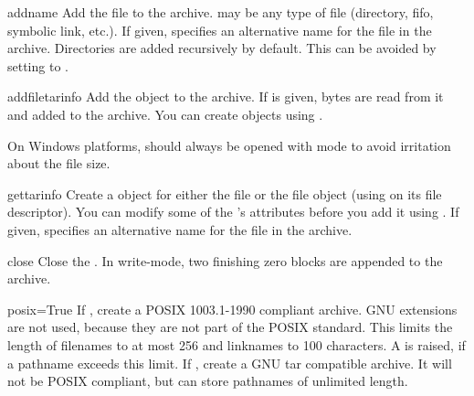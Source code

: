 \begin{methoddesc}{add}{name}
    Add the file  to the archive.  may be any type
    of file (directory, fifo, symbolic link, etc.).
    If given,  specifies an alternative name for the file in the
    archive. Directories are added recursively by default.
    This can be avoided by setting  to .
\end{methoddesc}

\begin{methoddesc}{addfile}{tarinfo}
    Add the  object  to the archive.
    If  is given,  bytes are read
    from it and added to the archive.  You can create  objects
    using .
    \begin{notice}
    On Windows platforms,  should always be opened with mode
     to avoid irritation about the file size.
    \end{notice}
\end{methoddesc}

\begin{methoddesc}{gettarinfo}{}
    Create a  object for either the file  or the
    file object  (using  on its file descriptor).
    You can modify some of the 's attributes before you add it
    using .
    If given,  specifies an alternative name for the file in the
    archive.
\end{methoddesc}

\begin{methoddesc}{close}{}
    Close the . In write-mode, two finishing zero blocks are
    appended to the archive.
\end{methoddesc}

\begin{memberdesc}{posix=True}
    If , create a POSIX 1003.1-1990 compliant archive. GNU
    extensions are not used, because they are not part of the POSIX standard.
    This limits the length of filenames to at most 256 and linknames to 100
    characters. A  is raised, if a pathname exceeds this
    limit.
    If , create a GNU tar compatible archive. It will not be POSIX
    compliant, but can store pathnames of unlimited length.
\end{memberdesc}

